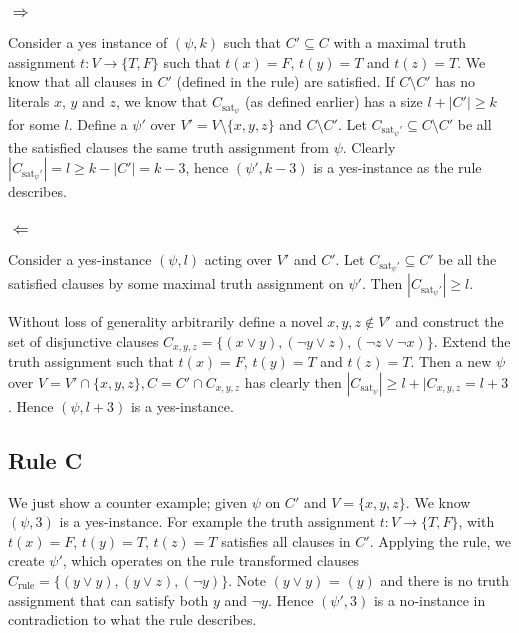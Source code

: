 \documentclass{article}
\begin{document}
\subsubsection*{$\Rightarrow$}
Consider a yes instance of $(\psi, k)$ such that $C' \subseteq C$ with a maximal truth assignment $t: V \rightarrow \{T,F\}$ such that $t(x)=F$, $t(y)=T$ and $t(z)=T$. We know that all clauses in $C'$ (defined in the rule) are satisfied. If $C \setminus C'$ has no literals $x$, $y$ and $z$, we know that $C_{\text{sat}_\psi}$ (as defined earlier) has a size $ l + |C'| \geq k$ for some $l$. Define a $\psi'$ over $V' = V \setminus \{x,y,z\}$ and $C \setminus C'$. Let $C_{\text{sat}_\psi'} \subseteq C\setminus C'$ be all the satisfied clauses the same truth assignment from $\psi$. Clearly $|C_{\text{sat}_\psi'}| = l \geq k - |C'| = k - 3$, hence $(\psi', k - 3)$ is a yes-instance as the rule describes.

\subsubsection*{$\Leftarrow$}
Consider a yes-instance $(\psi, l)$ acting over $V'$ and $C'$. Let $C_{\text{sat}_\psi'} \subseteq C'$ be all the satisfied clauses by some maximal truth assignment on $\psi'$. Then $|C_{\text{sat}_\psi'}| \geq l$.

Without loss of generality arbitrarily define a novel $x,y,z \not\in V'$ and construct the set of disjunctive clauses $C_{x,y,z} = \{(x \lor y), (\neg y \lor z), (\neg z \lor \neg x)\}$. Extend the truth assignment such that $t(x)=F$, $t(y)=T$ and $t(z)=T$. Then a new $\psi$ over $V = V' \cap \{x,y,z\}, C = C' \cap C_{x,y,z}$ has clearly then $|C_{\text{sat}_\psi}| \geq l + |C_{x,y,z} = l + 3$. Hence $(\psi, l + 3)$ is a yes-instance.

\subsection*{Rule C}
We just show a counter example; given $\psi$ on $C'$ and $V = \{x,y,z\}$. We know $(\psi, 3)$ is a yes-instance. For example the truth assignment $t: V \rightarrow\{T,F\}$, with $t(x)=F$, $t(y)=T$, $t(z)=T$ satisfies all clauses in $C'$. Applying the rule, 
we create $\psi'$, which operates on the rule transformed clauses $C_{\text{rule}}=\{(y \lor y), (y \lor z), (\lnot y)\}$. Note $(y \lor y)$ = $(y)$ and there is no truth assignment that can satisfy both $y$ and $\lnot y$. Hence $(\psi', 3)$ is a no-instance in contradiction to what the rule describes.
\end{document}
